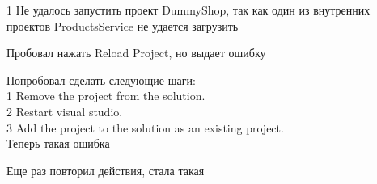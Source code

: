 \documentclass[a4paper,11pt]{article}
\begin{document}
\Large
1
Не удалось запустить проект DummyShop, так как один из внутренних проектов ProductsService не удается загрузить
\begin{center}
\label{fig:image}
\end{center}
Пробовал нажать Reload Project, но выдает ошибку
\begin{center}
\label{fig:image}
\end{center}
Попробовал сделать следующие шаги:\\
1 Remove the project from the solution.\\
2 Restart visual studio.\\
3 Add the project to the solution as an existing project.\\
Теперь такая ошибка
\begin{center}
\label{fig:image}
\end{center}
Еще раз повторил действия, стала такая
\begin{center}
\label{fig:image}
\end{center}
\end{document}
